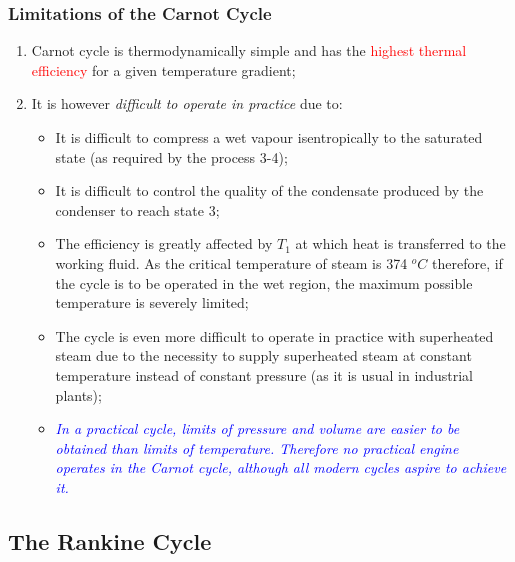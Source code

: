 \documentclass[10pt,compress]{beamer}
\begin{document}
\begin{frame}
 \frametitle{Limitations of the Carnot Cycle}
 \begin{enumerate}
  \item <1-> Carnot cycle is thermodynamically simple and has the \textcolor{red}{highest thermal efficiency} for a given temperature gradient;
  \item <2-> It is however {\it difficult to operate in practice} due to:
  \begin{itemize}
   \item <3-> It is difficult to compress a wet vapour isentropically to the saturated state (as required by the process 3-4);
   \item <4-> It is difficult to control the quality of the condensate produced by the condenser to reach state 3;
   \item <5-> The efficiency is greatly affected by $T_{1}$ at which heat is transferred to the working fluid. As the critical temperature of steam is 374 $^{o}C$ therefore, if the cycle is to be operated in the wet region, the maximum possible temperature is severely limited;
   \item <6-> The cycle is even more difficult to operate in practice with superheated steam due to the necessity to supply superheated steam at constant temperature instead of constant pressure (as it is usual in industrial plants);
   \item <7-> \textcolor{blue}{{\it In a practical cycle, limits of pressure and volume are easier to be obtained than limits of temperature. Therefore no practical engine operates in the Carnot cycle, although all modern cycles aspire to achieve it.}}
  \end{itemize}
 \end{enumerate}
 \normalsize
\end{frame}



\subsection{The Rankine Cycle}
\end{document}
